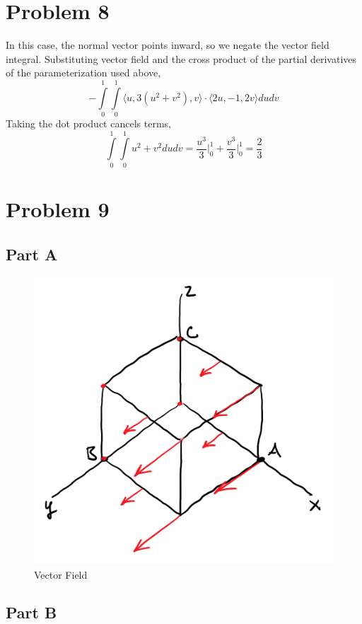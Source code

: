 \documentclass{article}
\begin{document}
\section*{Problem 8}

In this case, the normal vector points inward, so we negate the vector field
integral. Substituting vector field and the cross product of the partial
derivatives of the parameterization used above,
$$ -\int\limits_0^1\int\limits_0^1 \langle u, 3(u^2 + v^2), v \rangle \cdot
\langle 2u, -1, 2v \rangle du dv $$
Taking the dot product cancels terms,
$$ \int\limits_0^1\int\limits_0^1 u^2 + v^2 du dv = \frac{u^3}{3} \bigg\vert_0^1
+ \frac{v^3}{3} \bigg\vert_0^1 = \frac{2}{3} $$

\section*{Problem 9}

\subsection*{Part A}

\begin{figure}[H]
  \centering
  \includegraphics[scale=0.5]{"VectorField"}
  \caption{Vector Field}
\end{figure}

\subsection*{Part B}
\end{document}
